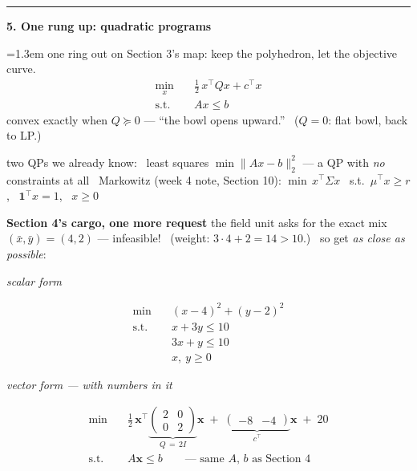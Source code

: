 \documentclass[10pt]{article}
\newcommand{\beat}[2]{%
  \par\bigskip\vspace{4pt}
  {\color{ruleink}\rule{\textwidth}{1pt}}\par\nobreak\vspace{4pt}
  {\large\bfseries #1.\; #2}\par\nobreak\vspace{6pt}}
\newenvironment{board}{%
  \par\vspace{4pt}
  \begingroup\leftskip=1.3em\relax\parskip=2pt\relax}{%
  \par\endgroup\vspace{4pt}}
\begin{document}
\beat{5}{One rung up: quadratic programs}
\begin{board}
one ring out on Section 3's map: keep the polyhedron, let the objective curve.
\[
\begin{aligned}
  \min_x\quad & \tfrac{1}{2}\,x^{\top}Qx + c^{\top}x \\
  \text{s.t.}\quad & Ax \le b
\end{aligned}
\]
convex exactly when $Q \succeq 0$ --- ``the bowl opens upward.'' \ ($Q = 0$: flat bowl, back to LP.)
\vspace{3pt}

two QPs we already know: \quad
\textbullet\ least squares $\min \|Ax-b\|_2^2$ --- a QP with \emph{no} constraints at all
\quad
\textbullet\ Markowitz (week 4 note, Section 10): $\min\, x^{\top}\Sigma x$ \ s.t.\ $\mu^{\top}x \ge r$, \ $\mathbf{1}^{\top}x = 1$, \ $x \ge 0$
\vspace{6pt}

\textbf{Section 4's cargo, one more request} \quad the field unit asks for the exact mix
$(\bar x, \bar y) = (4,2)$ --- infeasible! \ (weight: $3\cdot 4 + 2 = 14 > 10$.)
\ so get \emph{as close as possible}:
\vspace{2pt}

\begin{minipage}[t]{0.44\textwidth}
\begin{center}\emph{scalar form}\end{center}
\[
\begin{aligned}
  \min\quad & (x-4)^2 + (y-2)^2 \\
  \text{s.t.}\quad & x + 3y \le 10 \\
                   & 3x + y \le 10 \\
                   & x,\ y \ge 0
\end{aligned}
\]
\end{minipage}%
\hfill
\begin{minipage}[t]{0.54\textwidth}
\begin{center}\emph{vector form --- with numbers in it}\end{center}
\[
\begin{aligned}
  \min\quad & \tfrac{1}{2}\,\mathbf{x}^{\top}
     \underbrace{\begin{pmatrix} 2 & 0 \\ 0 & 2 \end{pmatrix}}_{Q \,=\, 2I}\mathbf{x}
     \;+\; \underbrace{\begin{pmatrix} -8 & -4 \end{pmatrix}}_{c^{\top}}\mathbf{x} \;+\; 20 \\
  \text{s.t.}\quad & A\mathbf{x} \le b \qquad \text{--- same $A$, $b$ as Section 4}
\end{aligned}
\]
\end{minipage}
\vspace{3pt}


\end{board}
\end{document}
